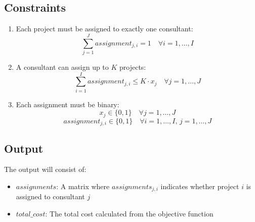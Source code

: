 \documentclass{article}
\begin{document}
\subsection*{Constraints}
\begin{enumerate}
    \item Each project must be assigned to exactly one consultant:
    \[
    \sum_{j=1}^{J} assignment_{j,i} = 1 \quad \forall i = 1, \ldots, I
    \]
    
    \item A consultant can assign up to \( K \) projects:
    \[
    \sum_{i=1}^{I} assignment_{j,i} \leq K \cdot x_{j} \quad \forall j = 1, \ldots, J
    \]

    \item Each assignment must be binary:
    \[
    x_{j} \in \{0, 1\} \quad \forall j = 1, \ldots, J
    \]
    \[
    assignment_{j,i} \in \{0, 1\} \quad \forall i = 1, \ldots, I, \, j = 1, \ldots, J
    \]
\end{enumerate}

\subsection*{Output}
The output will consist of:
\begin{itemize}
    \item \( assignments \): A matrix where \( assignments_{j,i} \) indicates whether project \( i \) is assigned to consultant \( j \)
    \item \( total\_cost \): The total cost calculated from the objective function
\end{itemize}
\end{document}
